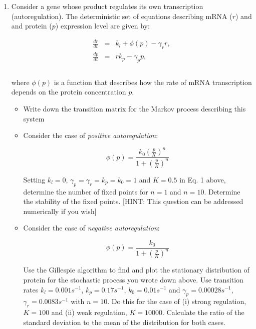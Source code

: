 \documentclass[12pt]{article}
\begin{document}
\begin{enumerate}
\item Consider a gene whose product regulates its own transcription (autoregulation). The deterministic set of equations describing mRNA ($r$) and and protein ($p$) expression level are given by:

\begin{eqnarray}
\nonumber \frac{dr}{dt}&=&k_l+\phi(p)-\gamma_{r}r,\\
\nonumber \frac{dp}{dt}&=&rk_{p}-\gamma_{p}p,\\
\end{eqnarray}
\\
where $\phi(p)$ is a function that describes how the rate of mRNA transcription depends on the protein concentration $p$.

\begin{itemize} 
\item Write down the transition matrix for the Markov process describing this system
\item Consider the case of \textit{positive autoregulation}:

\begin{equation*}
\phi(p)=\frac{k_{0}\left(\frac{p}{K}\right)^n}{1+\left(\frac{p}{K}\right)^n}
\end{equation*}

Setting $k_l=0$, $\gamma_p=\gamma_r=k_p=k_0=1$ and $K=0.5$ in Eq. 1 above, determine the number of fixed points for $n=1$ and $n=10$. Determine the stability of the fixed points. [HINT: This question can be addressed numerically if you wish]

\item Consider the case of \textit{negative autoregulation}:

\begin{equation*}
\phi(p)=\frac{k_{0}}{1+\left(\frac{p}{K}\right)^n}
\end{equation*}

Use the Gillespie algorithm to find and plot the stationary distribution of protein for the stochastic process you wrote down above. Use transition rates $k_l=0.001s^{-1}$, $k_p=0.17s^{-1}$, $k_0=0.01 s^{-1}$ and $\gamma_p=0.00028 s^{-1}$,  $\gamma_r=0.0083 s^{-1}$ with $n=10$. Do this for the case of (i) strong regulation, $K=100$ and (ii) weak regulation, $K=10000$. Calculate the ratio of the standard deviation to the mean of the distribution for both cases.

\end{itemize}

\end{enumerate}
\end{document}
